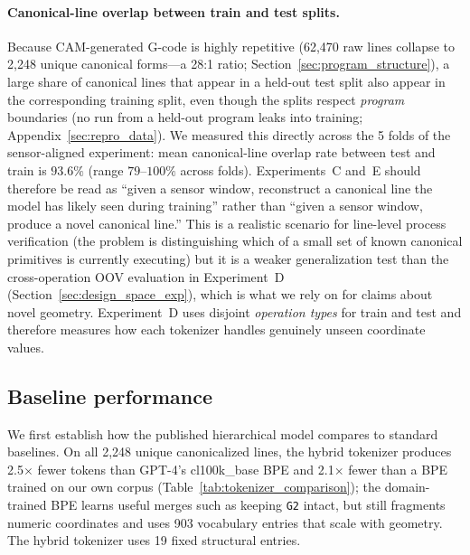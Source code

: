 \documentclass[11pt]{article}
\begin{document}
\paragraph{Canonical-line overlap between train and test splits.}
Because CAM-generated G-code is highly repetitive (62{,}470 raw lines collapse to 2{,}248 unique canonical forms---a 28:1 ratio; Section~\ref{sec:program_structure}), a large share of canonical lines that appear in a held-out test split also appear in the corresponding training split, even though the splits respect \emph{program} boundaries (no run from a held-out program leaks into training; Appendix~\ref{sec:repro_data}). We measured this directly across the 5 folds of the sensor-aligned experiment: mean canonical-line overlap rate between test and train is $93.6\%$ (range $79$--$100\%$ across folds). Experiments~C and~E should therefore be read as ``given a sensor window, reconstruct a canonical line the model has likely seen during training'' rather than ``given a sensor window, produce a novel canonical line.'' This is a realistic scenario for line-level process verification (the problem is distinguishing which of a small set of known canonical primitives is currently executing) but it is a weaker generalization test than the cross-operation OOV evaluation in Experiment~D (Section~\ref{sec:design_space_exp}), which is what we rely on for claims about novel geometry. Experiment~D uses disjoint \emph{operation types} for train and test and therefore measures how each tokenizer handles genuinely unseen coordinate values.

\subsection{Baseline performance}
\label{sec:baseline_performance}

We first establish how the published hierarchical model compares to standard baselines. On all 2{,}248 unique canonicalized lines, the hybrid tokenizer produces 2.5$\times$ fewer tokens than GPT-4's cl100k\_base BPE and 2.1$\times$ fewer than a BPE trained on our own corpus (Table~\ref{tab:tokenizer_comparison}); the domain-trained BPE learns useful merges such as keeping \texttt{G2} intact, but still fragments numeric coordinates and uses 903 vocabulary entries that scale with geometry. The hybrid tokenizer uses 19 fixed structural entries.
\end{document}
